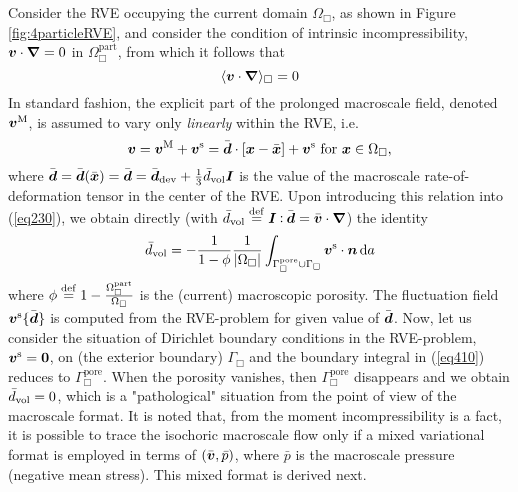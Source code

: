 \documentclass[10pt,a4paper]{article}
\newcommand{\pore}{\mathrm{pore}}
\newcommand{\particle}{\mathrm{part}}
\begin{document}
Consider the RVE occupying the current domain $\Omega_\Box$, as shown in Figure \ref{fig:4particleRVE}, and consider the condition of intrinsic incompressibility, $\boldsymbol{v}\cdot\boldsymbol{\nabla}=0$ in $\Omega_\Box^\particle$, from which it follows that
\begin{equation}
    \langle \boldsymbol{v}\cdot\boldsymbol{\nabla} \rangle_\Box  = 0
\label{eq230}
\end{equation}
In standard fashion, the explicit part of the prolonged macroscale field, denoted $\boldsymbol{v}^{\mathrm{M}}$, is assumed to vary only \emph{linearly} within the RVE, i.e.
\begin{equation}
    \boldsymbol{v} = \boldsymbol{v}^{\mathrm{M}} + \boldsymbol{v}^{\mathrm{s}} =
    \bar{\boldsymbol{d}} \cdot [\boldsymbol{x}-\bar{\boldsymbol{x}}] + \boldsymbol{v}^{\mathrm{s}} \mbox{ for }\boldsymbol{x}\in\Omega_\Box,
    \label{eq409}
\end{equation}
where $\bar{\boldsymbol{d}}=\bar{\boldsymbol{d}}(\bar{\boldsymbol{x}})=\bar{\boldsymbol{d}}=\bar{\boldsymbol{d}}_{\mathrm{dev}}+\frac{1}{3}\bar{d}_{\mathrm{vol}}\boldsymbol{I}$ is the value of the macroscale rate-of-deformation tensor in the center of the RVE. Upon introducing this relation into (\ref{eq230}), we obtain directly (with $\bar{d}_{\mathrm{vol}}\overset{\mathrm{def}}{=}\boldsymbol{I}\mathbin{\vcentcolon}\bar{\boldsymbol{d}}=\bar{\boldsymbol{v}}\cdot\boldsymbol{\nabla}$) the identity
\begin{equation}
    \bar{d}_\vol = - \frac{1}{1-\phi}\frac{1}{|\Omega_\Box|}\int_{\Gamma_\Box^\pore\cup\Gamma_\Box} \ta{v}^\fluct\cdot\ta{n} \dif a
    \label{eq410}
\end{equation}
where $\phi\defeq 1-\frac{\Omega_\Box^\particle}{\Omega_\Box}$ is the (current) macroscopic porosity. The fluctuation field $\boldsymbol{v}^{\mathrm{s}}\{\bar{\boldsymbol{d}}\}$ is computed from the RVE-problem for given value of $\bar{\boldsymbol{d}}$. Now, let us consider the situation of Dirichlet boundary conditions in the RVE-problem, $\boldsymbol{v}^{\mathrm{s}}=\boldsymbol{0}$, on (the exterior boundary) $\Gamma_\Box$ and the boundary integral in (\ref{eq410}) reduces to $\Gamma_\Box^\pore$. When the porosity vanishes, then $\Gamma_\Box^\pore$ disappears and we obtain $\bar{d}_{\mathrm{vol}} = 0$, which is a "pathological" situation from the point of view of the macroscale format. It is noted that, from the moment incompressibility is a fact, it is possible to trace the isochoric macroscale flow only if a mixed variational format is employed in terms of $(\bar{\boldsymbol{v}},\bar{p})$, where $\bar{p}$ is the macroscale pressure (negative mean stress). This mixed format is derived next.
\end{document}
